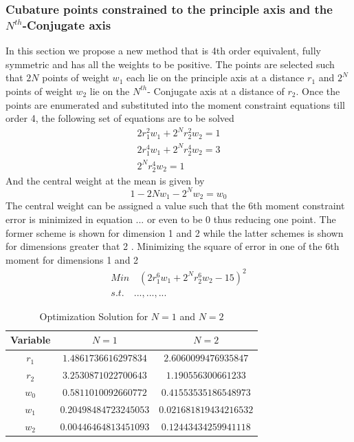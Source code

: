 \documentclass[letterpaper, 10 pt, conference]{ieeeconf}  %
\begin{document}
\subsubsection{Cubature points constrained to the principle axis and the $N^{th}$-Conjugate axis}
In this section we propose a new method that is 4th order equivalent, fully symmetric and has all the weights to be positive. The points are selected such that $2N$ points of weight $w_1$ each lie on the principle axis at a distance $r_1$ and $2^N$ points of weight $w_2$ lie on the $N^{th}$- Conjugate axis at a distance of $r_2$. Once the points are enumerated and substituted into the moment constraint equations till order 4, the following set of equations are to be solved
\setlength{\arraycolsep}{0.0em}
\begin{eqnarray}
2r_1^2w_1+2^Nr_2^2w_2=1\\
2r_1^4w_1+2^Nr_2^4w_2=3\\
2^Nr_2^4w_2=1
\end{eqnarray}
\setlength{\arraycolsep}{5pt}
And the central weight at the mean is given by
\begin{equation}
1-2Nw_1-2^Nw_2=w_0
\end{equation}    
The central weight can be assigned a value such that the 6th moment constraint error is minimized in equation ...  or even to be 0 thus reducing one point. The former scheme is shown for dimension 1 and 2 while the latter schemes is shown for dimensions greater that 2 .\newline
Minimizing the square of error in one of the 6th moment for dimensions 1 and 2
\setlength{\arraycolsep}{0.0em}
\begin{eqnarray}
Min \quad (2r_1^6w_1+2^Nr_2^6w_2-15)^2\\
s.t. \quad ..., ... , ...
\end{eqnarray}
\setlength{\arraycolsep}{5pt}

\begin{table}
\caption{Optimization Solution for $N=1$ and $N=2$ }
\label{optsoln12}
\begin{center}
\begin{tabular}{|c||c|c|}
\hline
Variable & $N=1$ & $N=2$\\
\hline
$r_1$ & $1.4861736616297834 $  &  $2.6060099476935847 $  \\
\hline
$r_2$ & $3.2530871022700643 $  &  $1.190556300661233 $  \\
\hline
$w_0$ & $0.5811010092660772 $  &  $0.41553535186548973 $  \\
\hline
$w_1$ & $0.20498484723245053 $  &  $0.021681819434216532 $  \\
\hline
$w_2$ & $0.00446464813451093 $  &  $0.12443434259941118 $  \\
\hline
\end{tabular}
\end{center}
\end{table}
\end{document}
